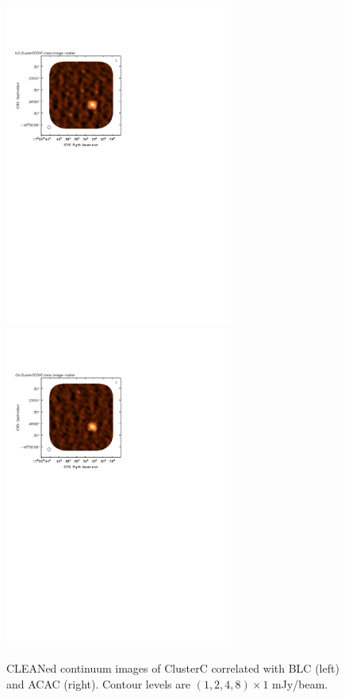 \documentclass[a4paper, 10pt]{scrartcl}
\begin{document}
\begin{figure}[h]
	\centering
	\includegraphics[width=7.5cm]{BLC.ClusterC.pdf}
	\includegraphics[width=7.5cm]{ACA.ClusterC.pdf}
	\caption{CLEANed continuum images of ClusterC correlated with BLC (left) and ACAC (right). Contour levels are $(1, 2, 4, 8) \times 1$ mJy/beam.}\label{fig:contimage}
\end{figure}
\end{document}
